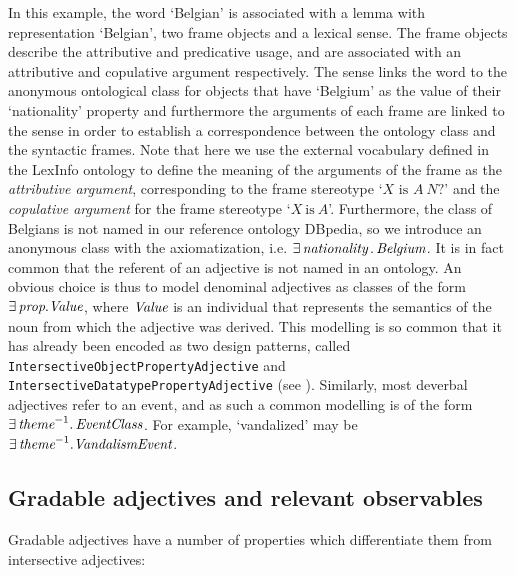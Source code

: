 \documentclass[11pt]{article}
\begin{document}
In this example, the word `Belgian' is associated with a lemma with representation
`Belgian', two frame objects and a lexical sense. The frame objects describe the
attributive and predicative usage, and are associated with an attributive and
copulative argument respectively. The sense links the word to the anonymous
ontological class for objects that have `Belgium' as the value of their `nationality'
property and furthermore the arguments of each frame are linked to the sense in order to
establish a correspondence between the ontology class and the syntactic frames.
Note that here we use the external vocabulary defined in the LexInfo ontology \cite{cimiano2011lexinfo} 
to define the meaning of the arguments of the frame as the \emph{attributive 
argument}, corresponding to the frame stereotype `$X\text{ is }A~N?$' and the 
\emph{copulative argument} for the frame stereotype `$X\mathrm{~is~}A$'. Furthermore,
the class of Belgians is not named in our reference ontology DBpedia, so we 
introduce an anonymous class with the axiomatization, i.e. 
$\exists\,\text{\em nationality}\,.\,\text{\em Belgium}$. It is in fact common that the 
referent of an adjective is not named in an ontology. An obvious choice is thus to model denominal adjectives as classes of the form $\exists\,\text{\em prop}.\text{\em Value}$, 
where $\text{\em Value}$ is an individual that represents the semantics of the noun from which the adjective was derived. This modelling is so common that it has already been encoded as two
design patterns, called {\tt IntersectiveObjectPropertyAdjective} and {\tt
IntersectiveDatatypePropertyAdjective} (see \cite{mccrae2014design}).
Similarly, most deverbal adjectives refer to an event, and as such
a common modelling is of the form $\exists\,\text{\em theme}^{-1}. \,\text{\em EventClass}$.
For example, `vandalized' may be $\exists\,\text{\em theme}^{-1}.\text{\em VandalismEvent}$.

\subsection{Gradable adjectives and relevant observables} \label{sec:gradables}

Gradable adjectives have a number of properties which differentiate them
from intersective adjectives:
\end{document}
